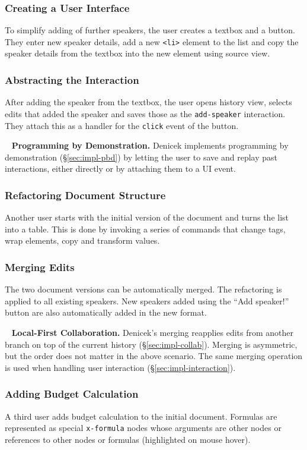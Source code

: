 \documentclass[sigconf,anonymous,screen]{acmart}
\newcommand*\circled[1]{\textnormal{\footnotesize\sffamily\bfseries\protect\tikz[baseline=(char.base)]{
  \node[shape=circle,fill=black,text=white,draw,inner sep=1pt] (char) {#1};}}}
\DeclareRobustCommand{\keyideabox}[3]{\begin{tcolorbox}[breakable,
  boxsep=5pt,left=0pt,right=0pt,top=0pt,bottom=0pt,width=\dimexpr\columnwidth\relax,
  colback=gray!20,colframe=gray!20,
  enlarge bottom by=0pt,enlarge top by=0pt,
  arc=0pt,outer arc=0pt]
\lettrine[lraise=0.3]{\LARGE #1}{~}
\small \textbf{#2.} #3
\end{tcolorbox}
}
\begin{document}
\subsubsection*{\circled{B} Creating a User Interface} To simplify adding of
further speakers, the user creates a textbox and a button. They enter new speaker
details, add a new {\small\Verb_<li>_} element to the list and copy the speaker details
from the textbox into the new element using source view.

\subsubsection*{\circled{C} Abstracting the Interaction} After adding the speaker from the textbox,
the user opens history view, selects edits that added the speaker and saves those as the
{\small\Verb_add-speaker_} interaction. They attach this as a handler for the {\small\Verb_click_} event of the button.

\keyideabox{\faLightbulbO}{Programming by Demonstration}{Denicek implements programming by
demonstration (\S\ref{sec:impl-pbd}) by letting the user to save and replay past interactions,
either directly or by attaching them to a UI event.}

\subsubsection*{\circled{D} Refactoring Document Structure} Another user starts with the initial
version of the document and turns the list into a table. This is done by invoking a series of
commands that change tags, wrap elements, copy and transform values.

\subsubsection*{\circled{E} Merging Edits} The two document versions can be automatically merged.
The refactoring is applied to all existing speakers. New speakers added using the ``Add speaker!''
button are also automatically added in the new format.

\keyideabox{\faLightbulbO}{Local-First Collaboration}{Denicek's merging
reapplies edits from another branch on top of the current history (\S\ref{sec:impl-collab}).
Merging is asymmetric, but the order does not matter in the above scenario. The same merging
operation is used when handling user interaction (\S\ref{sec:impl-interaction}).}

\subsubsection*{\circled{F} Adding Budget Calculation} A third user adds budget calculation to
the initial document. Formulas are represented as special {\small\Verb_x-formula_} nodes whose arguments
are other nodes or references to other nodes or formulas (highlighted on mouse hover).
\end{document}
